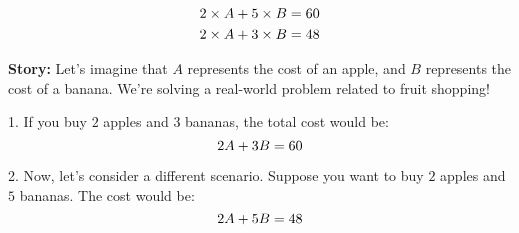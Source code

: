 \documentclass[12pt]{article}
\begin{document}
\newcommand{\valA}{15} %
\newcommand{\valB}{6}  %
\newcommand{\valp}{2}  %
\newcommand{\valq}{5}  %
\newcommand{\valr}{3}  %

\newcommand{\valC}{\the\numexpr\valp*\valA+\valq*\valB\relax} %
\newcommand{\valD}{\the\numexpr\valp*\valA+\valr*\valB\relax} %


\begin{center}
\Large
\begin{align*}
\valp \times A + \valq \times B &= \valC \\
\valp \times A + \valr \times B &= \valD
\end{align*}
\end{center}

\vspace{1cm}
\textbf{Story:} Let's imagine that \(A\) represents the cost of an apple, and \(B\) represents the cost of a banana. We're solving a real-world problem related to fruit shopping!

1. If you buy \(2\) apples and \(3\) bananas, the total cost would be:
\[2A + 3B = \valC\]

2. Now, let's consider a different scenario. Suppose you want to buy \(2\) apples and \(5\) bananas. The cost would be:
\[2A + 5B = \valD\]

\vspace{2cm}
\pgfmathsetmacro{\heightA}{\valp*\valA} %
\pgfmathsetmacro{\heightB}{\valq*\valB} %
\pgfmathsetmacro{\heightC}{\valr*\valB} %

\newcommand{\maxHeight}{4} %

\pgfmathsetmacro{\scaleFactor}{\maxHeight / \totalHeight}

\pgfmathsetmacro{\scaledHeightA}{\scaleFactor*\heightA} %
\pgfmathsetmacro{\scaledHeightB}{\scaleFactor*\heightB} %
\pgfmathsetmacro{\scaledHeightC}{\scaleFactor*\heightC} %
\end{document}

